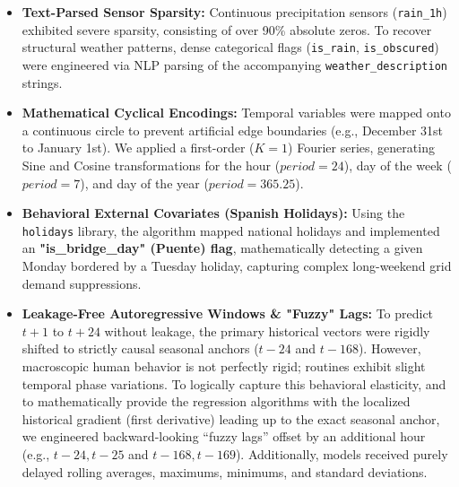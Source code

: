 \documentclass{article}
\begin{document}
\begin{itemize}
    \item \textbf{Text-Parsed Sensor Sparsity:} Continuous precipitation sensors (\texttt{rain\_1h}) exhibited severe sparsity, consisting of over 90\% absolute zeros. To recover structural weather patterns, dense categorical flags (\texttt{is\_rain}, \texttt{is\_obscured}) were engineered via NLP parsing of the accompanying \texttt{weather\_description} strings.
    \item \textbf{Mathematical Cyclical Encodings:} Temporal variables were mapped onto a continuous circle to prevent artificial edge boundaries (e.g., December 31st to January 1st). We applied a first-order ($K=1$) Fourier series, generating Sine and Cosine transformations for the hour ($period=24$), day of the week ($period=7$), and day of the year ($period=365.25$).
    \item \textbf{Behavioral External Covariates (Spanish Holidays):} Using the \texttt{holidays} library, the algorithm mapped national holidays and implemented an \textbf{"is\_bridge\_day" (Puente) flag}, mathematically detecting a given Monday bordered by a Tuesday holiday, capturing complex long-weekend grid demand suppressions.
    \item \textbf{Leakage-Free Autoregressive Windows \& "Fuzzy" Lags:} To predict $t+1$ to $t+24$ without leakage, the primary historical vectors were rigidly shifted to strictly causal seasonal anchors ($t-24$ and $t-168$). However, macroscopic human behavior is not perfectly rigid; routines exhibit slight temporal phase variations. To logically capture this behavioral elasticity, and to mathematically provide the regression algorithms with the localized historical gradient (first derivative) leading up to the exact seasonal anchor, we engineered backward-looking ``fuzzy lags'' offset by an additional hour (e.g., $t-24, t-25$ and $t-168, t-169$). Additionally, models received purely delayed rolling averages, maximums, minimums, and standard deviations.
\end{itemize}
\end{document}
